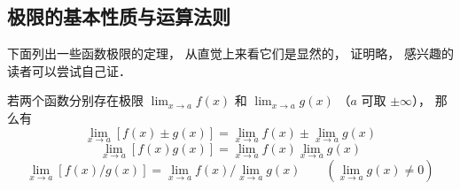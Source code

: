 \subsection{极限的基本性质与运算法则}
下面列出一些函数极限的定理， 从直觉上来看它们是显然的， 证明略， 感兴趣的读者可以尝试自己证．
\begin{theorem}{}
若两个函数分别存在极限 $\lim_{x\to a} f(x)$ 和 $\lim_{x\to a} g(x)$ （$a$ 可取 $\pm \infty$）， 那么有
\begin{equation}
\lim_{x\to a} [f(x) \pm g(x)] = \lim_{x\to a}f(x) \pm  \lim_{x\to a} g(x)
\end{equation}
\begin{equation}
\lim_{x\to a} [f(x) g(x)] = \lim_{x\to a}f(x) \lim_{x\to a} g(x)
\end{equation}
\begin{equation}
\lim_{x\to a} [f(x)/g(x)] = \lim_{x\to a}f(x)/\lim_{x\to a} g(x) \qquad (\lim_{x\to a} g(x) \ne 0)
\end{equation}
\end{theorem}
